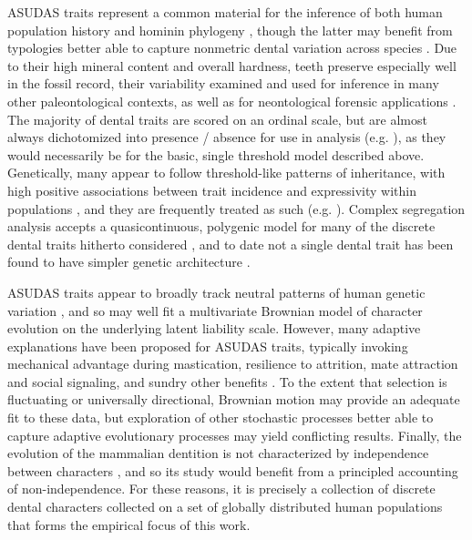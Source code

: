 ASUDAS traits represent a common material for the inference of both human population history \citep{hubbardNuclearDNADental2015, rathmannReconstructingHumanPopulation2017, reyes-centenoTestingModernHuman2017} and hominin phylogeny \citep{irishDentalMorphologyPhylogenetic2013, irishAncientTeethPhenetic2018}, though the latter may benefit from typologies better able to capture nonmetric dental variation across species \citep{baileyNeandertalDentalMorphology2002, carterNewsViewsNonmetric2014}. Due to their high mineral content and overall hardness, teeth preserve especially well in the fossil record, their variability examined and used for inference in many other paleontological contexts, as well as for neontological forensic applications \citep{scottRASUDASNewWebbased2018}. The majority of dental traits are scored on an ordinal scale, but are almost always dichotomized into presence / absence for use in analysis (e.g. \citealt{irishDentalMorphologyPhylogenetic2013}), as they would necessarily be for the basic, single threshold model described above. Genetically, many appear to follow threshold-like patterns of inheritance, with high positive associations between trait incidence and expressivity within populations \citep{scottDentalMorphologyGenetic1973}, and they are frequently treated as such (e.g. \citealt{rathmannTestingUtilityDental2020}). Complex segregation analysis accepts a quasicontinuous, polygenic model for many of the discrete dental traits hitherto considered \citep{nicholComplexSegregationAnalysis1989}, and to date not a single dental trait has been found to have simpler genetic architecture \citep{scottAnthropologyModernHuman2018}. 

ASUDAS traits appear to broadly track neutral patterns of human genetic variation \citep{haniharaMorphologicalVariationMajor2008, rathmannTestingUtilityDental2020}, and so may well fit a multivariate Brownian model of character evolution on the underlying latent liability scale. However, many adaptive explanations have been proposed for ASUDAS traits, typically invoking mechanical advantage during mastication, resilience to attrition, mate attraction and social signaling, and sundry other benefits \citep{scottAnthropologyModernHuman2018}. To the extent that selection is fluctuating or universally directional, Brownian motion may provide an adequate fit to these data, but exploration of other stochastic processes better able to capture adaptive evolutionary processes may yield conflicting results. Finally, the evolution of the mammalian dentition is not characterized by independence between characters \citep{brocklehurstDentalCharactersUsed2020}, and so its study would benefit from a principled accounting of non-independence. For these reasons, it is precisely a collection of discrete dental characters collected on a set of globally distributed human populations that forms the empirical focus of this work.


